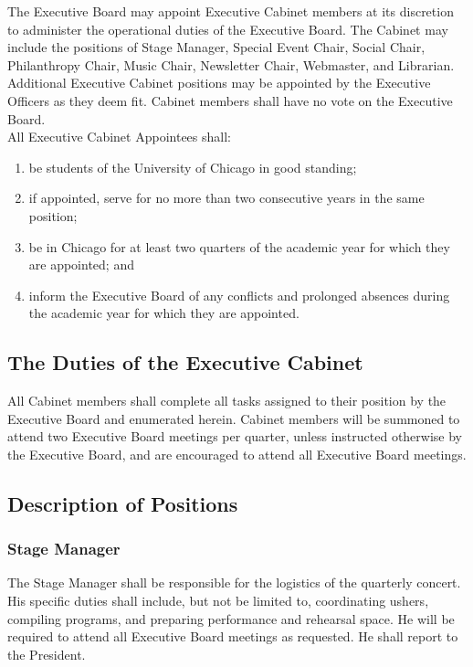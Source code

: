 \documentclass{article}
\begin{document}
The Executive Board may appoint Executive Cabinet members at its discretion
to administer the operational duties of the Executive Board. The Cabinet
may include the positions of Stage Manager, Special Event Chair,
Social Chair, Philanthropy Chair, Music Chair, Newsletter Chair, Webmaster,
and Librarian. Additional Executive Cabinet positions may be appointed
by the Executive Officers as they deem fit. Cabinet members shall
have no vote on the Executive Board. \\
 All Executive Cabinet Appointees shall:
\begin{enumerate}
\item be students of the University of Chicago in good standing;
\item if appointed, serve for no more than two consecutive years in the
same position;
\item be in Chicago for at least two quarters of the academic year for which
they are appointed; and
\item inform the Executive Board of any conflicts and prolonged absences
during the academic year for which they are appointed.
\end{enumerate}

\subsection{The Duties of the Executive Cabinet}

All Cabinet members shall complete all tasks assigned to their position
by the Executive Board and enumerated herein. Cabinet members will
be summoned to attend two Executive Board meetings per quarter, unless
instructed otherwise by the Executive Board, and are encouraged to
attend all Executive Board meetings.

\subsection{Description of Positions}


\subsubsection{Stage Manager}

The Stage Manager shall be responsible for the logistics of the quarterly
concert. His specific duties shall include, but not be limited to,
coordinating ushers, compiling programs, and preparing performance
and rehearsal space. He will be required to attend all Executive Board
meetings as requested. He shall report to the President.
\end{document}
